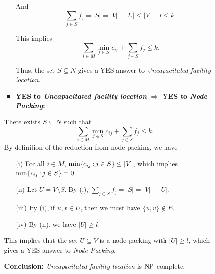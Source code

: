 \documentclass[../open-optimization/open-optimization.tex]{subfiles}
\begin{document}
\begin{enumerate}
\begin{enumerate}
\begin{itemize}
	And
	$$\sum_{j\in S}f_j=|S|=|V|-|U|\leq |V|-l\leq k.$$
	
	This implies $$\sum_{i\in M}\min_{j\in S} c_{ij} + \sum_{j\in S}f_j \leq k.$$
	
	Thus, the set $S\subseteq N$ gives a YES answer to {\em Uncapacitated facility location}. 
	
	\item {\bf YES to {\em Uncapacitated facility location} $\Rightarrow$ YES to  {\em Node Packing}:}



\end{itemize}
		


There exists $S\subseteq N$ such that
$$\sum_{i\in M}\min_{j\in S} c_{ij} + \sum_{j\in S}f_j \leq k.$$
By definition of the reduction from node packing, we have
\begin{itemize}
	\item[(i)] For all $i\in M$, $\min\{c_{ij}{\,:\,} j\in S\}\leq |V|$, which implies $\min\{c_{ij}{\,:\,} j\in S\}=0$.
	\item[(ii)] Let $U=V\setminus S$. By (i), $\sum_{j\in S}f_j=|S|=|V|-|U|$.
	\item[(iii)] By (i), if $u,v\in U$, then we must have $\{u,v\}\notin E$.
	\item[(iv)] By (ii), we have $|U|\geq l$. 
\end{itemize}

This implies that the set $U\subseteq V$ is a node packing with $|U|\geq l$, which gives a YES answer to  {\em Node Packing}.

{\bf Conclusion:}	{\em Uncapacitated facility location} is $\text{NP}$-complete.
\end{enumerate}
\end{enumerate}
\end{document}
